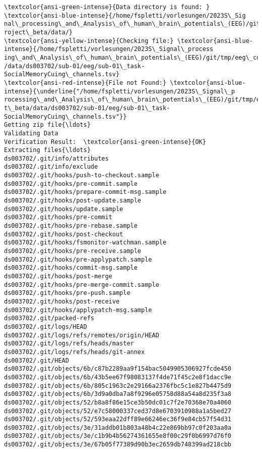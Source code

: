 \documentclass[11pt]{article}
\begin{document}
    \begin{Verbatim}[commandchars=\\\{\}]
\textcolor{ansi-green-intense}{Data directory is found: } \textcolor{ansi-blue-intense}{/home/fspletti/vorlesungen/2023S\_Sig
nal\_processing\_and\_Analysis\_of\_human\_brain\_potentials\_(EEG)/git/tmp/eeg\_course\_p
roject\_beta/data/}
\textcolor{ansi-yellow-intense}{Checking file:} \textcolor{ansi-blue-intense}{/home/fspletti/vorlesungen/2023S\_Signal\_process
ing\_and\_Analysis\_of\_human\_brain\_potentials\_(EEG)/git/tmp/eeg\_course\_project\_beta
/data/ds003702/sub-01/eeg/sub-01\_task-SocialMemoryCuing\_channels.tsv}
\textcolor{ansi-red-intense}{File not Found:} \textcolor{ansi-blue-intense}{\underline{"/home/fspletti/vorlesungen/2023S\_Signal\_p
rocessing\_and\_Analysis\_of\_human\_brain\_potentials\_(EEG)/git/tmp/eeg\_course\_projec
t\_beta/data/ds003702/sub-01/eeg/sub-01\_task-
SocialMemoryCuing\_channels.tsv"}}
Getting zip file{\ldots}
Validating Data
Verification Result:  \textcolor{ansi-green-intense}{OK}
Extracting files{\ldots}
ds003702/.git/info/attributes
ds003702/.git/info/exclude
ds003702/.git/hooks/push-to-checkout.sample
ds003702/.git/hooks/pre-commit.sample
ds003702/.git/hooks/prepare-commit-msg.sample
ds003702/.git/hooks/post-update.sample
ds003702/.git/hooks/update.sample
ds003702/.git/hooks/pre-commit
ds003702/.git/hooks/pre-rebase.sample
ds003702/.git/hooks/post-checkout
ds003702/.git/hooks/fsmonitor-watchman.sample
ds003702/.git/hooks/pre-receive.sample
ds003702/.git/hooks/pre-applypatch.sample
ds003702/.git/hooks/commit-msg.sample
ds003702/.git/hooks/post-merge
ds003702/.git/hooks/pre-merge-commit.sample
ds003702/.git/hooks/pre-push.sample
ds003702/.git/hooks/post-receive
ds003702/.git/hooks/applypatch-msg.sample
ds003702/.git/packed-refs
ds003702/.git/logs/HEAD
ds003702/.git/logs/refs/remotes/origin/HEAD
ds003702/.git/logs/refs/heads/master
ds003702/.git/logs/refs/heads/git-annex
ds003702/.git/HEAD
ds003702/.git/objects/6b/c87b2289aa9f154bac5049905306927fcde450
ds003702/.git/objects/6b/43b5ee67f98083137f4de71f45c2e8f1dacc9e
ds003702/.git/objects/6b/805c1963c2e29166a2376fbc5c1e827b4475d9
ds003702/.git/objects/6b/3d9a0dba7a8f9296e05758d88a54a8d235f3a8
ds003702/.git/objects/52/b8a8f86e15ce3b50dc01c7f2e70368e70a4060
ds003702/.git/objects/52/e7c58000337ced37d8e6703910988a1a5bed27
ds003702/.git/objects/52/593eaa22dff89e66246ec36f9e84cb57f54d31
ds003702/.git/objects/3e/31addb01b803a48b4c22e869bb97c0f203aa0a
ds003702/.git/objects/3e/c1b9b4b56274361655e8f00c29f0b6997d76f0
ds003702/.git/objects/3e/67b05f77389d90b3ec2659db748399ad218cbb

\end{Verbatim}
\end{document}
